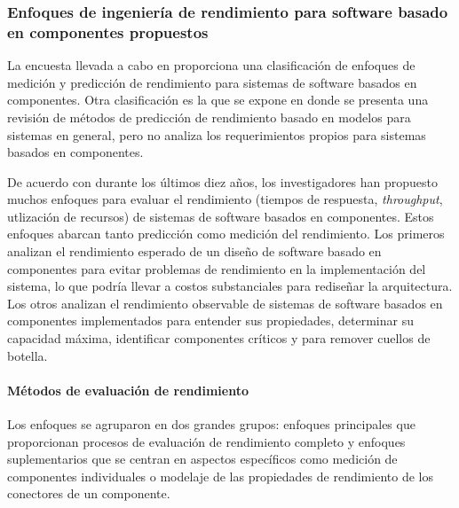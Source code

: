 \subsubsection{Enfoques de ingeniería de rendimiento para software basado en componentes propuestos}
La encuesta llevada a cabo en \cite{Koziolek:2010:PEC:1808359.1808729} proporciona una clasificación de enfoques de medición y predicción de rendimiento para sistemas de software basados en componentes. Otra clasificación es la que se expone en \cite{1291833} donde se presenta una revisión de métodos de predicción de rendimiento basado en modelos para sistemas en general, pero no analiza los requerimientos propios para sistemas basados en componentes. 

De acuerdo con \cite{Koziolek:2010:PEC:1808359.1808729} durante los últimos diez años, los investigadores han propuesto muchos enfoques para evaluar el rendimiento (tiempos de respuesta, \emph{throughput}, utlización de recursos) de sistemas de software basados en componentes. Estos enfoques abarcan tanto predicción como medición del rendimiento. Los primeros analizan el rendimiento esperado de un diseño de software basado en componentes para evitar problemas de rendimiento en la implementación del sistema, lo que podría llevar a costos substanciales para rediseñar la arquitectura. Los otros analizan el rendimiento observable de sistemas de software basados en componentes implementados para entender sus propiedades, determinar su capacidad máxima, identificar componentes críticos y para remover cuellos de botella.

\paragraph{Métodos de evaluación de rendimiento}
Los enfoques se agruparon en dos grandes grupos: enfoques principales que proporcionan procesos de evaluación de rendimiento completo y enfoques suplementarios que se centran en aspectos específicos como medición de componentes individuales o modelaje de las propiedades de rendimiento de los conectores de un componente.


